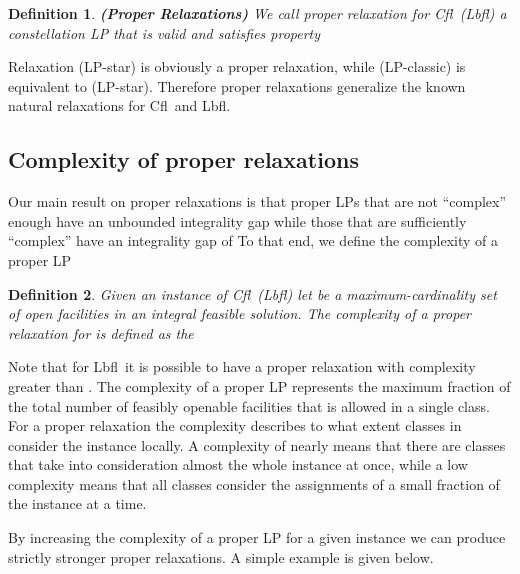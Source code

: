 \documentclass[11pt]{article}\usepackage{amsmath}
\newtheorem{definition}{Definition}[section]
\newcommand{\lbfl}{{\sc Lbfl}}
\newcommand{\cfl}{{\sc Cfl}}
\begin{document}
\begin{definition}  {\bf (Proper Relaxations)}  \label{def:proper} 
We call {\em proper relaxation}  for \cfl\ (\lbfl\/)  a constellation LP
 that is valid and satisfies property  
\end{definition}


Relaxation (LP-star) is
obviously a proper relaxation, while (LP-classic) is equivalent to
(LP-star). Therefore proper relaxations generalize the known natural
relaxations for \cfl\ and \lbfl. 









\subsection{Complexity of proper relaxations}
\label{proper proof}

Our main result on proper relaxations is that     proper LPs that  are not
``complex'' enough have an unbounded integrality gap while those  that
are sufficiently ``complex'' have an integrality gap of   To that end, we
define  the complexity  of  a  proper LP 
\iffalse
Furthermore, for each  such facility   we  denote by
 the  set of clients   for which  there is a facility   so
that  in .
\fi 

\begin{definition}   \label{def:complexity}
Given an instance  of \cfl\ (\lbfl\/)
let  be  a 
maximum-cardinality set  of open facilities in an integral feasible
solution. The {\em complexity } of a  proper
relaxation  for  is
defined as the  
\end{definition}

Note that for \lbfl\ it is possible  to have a proper relaxation with complexity greater
than . 
The  complexity of  a  proper LP  represents the  maximum
fraction of the  total number of feasibly openable  facilities that is
allowed in a single class. 
For   a  proper relaxation   the  complexity
describes to what extent 
 classes in  consider the instance locally. 
A complexity of nearly 
means that there are classes that take into consideration almost the whole instance
at once, while a low complexity means that all classes consider
the assignments of a small fraction of the instance at a time.  
\iffalse ===========================
We remark
that    the   proper    LP    with   an    integral   polytope    from
Theorem~\ref{thm:gap1} has
a complexity of   since every class corresponds  by construction to
a feasible integral solution. 
(Clearly not every LP with complexity  has an integrality gap of 
since it might contain weak classes together with the strong
ones.) 
============ \fi 
By increasing the complexity of a proper LP  for a given instance 
 we can produce strictly stronger 
proper relaxations. A simple example is given below. 
\end{document}
